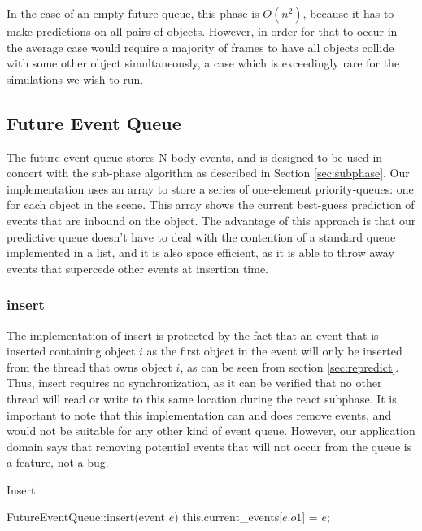 \documentclass[conference]{IEEEtran}
\begin{document}
In the case of an empty future queue, this phase is $O(n^2)$, because it has to make predictions on all pairs of objects.  However, in order for that to occur in the average case would require a majority of frames to have all objects collide
with some other object simultaneously, a case which is exceedingly rare for the simulations we wish to run.

\subsection{Future Event Queue}
\label{feq}
The future event queue stores N-body events, and is designed to be used in concert with the sub-phase algorithm as described in Section \ref{sec:subphase}.
Our implementation uses an array to store a series of one-element priority-queues: one for each object in the scene.  This array shows the current best-guess
prediction of events that are inbound on the object.  The advantage of this approach is that our predictive queue doesn't have to deal with the contention of 
a standard queue implemented in a list, and it is also space efficient, as it is able to throw away events that supercede other events at insertion time.


\subsubsection{insert}

The implementation of insert is protected by the fact that an event that is inserted containing object $i$ as the first object in the event will only
be inserted from the thread that owns object $i$, as can be seen from section \ref{sec:repredict}.  Thus, insert requires no synchronization, as it can be verified
that no other thread will read or write to this same location during the react subphase.  It is important to note that this implementation can and does remove events,
and would not be suitable for any other kind of event queue.  However, our application domain says that removing potential events that will not occur from the queue is a feature, not a bug.

\begin{algorithm}
\caption{Insert}
\begin{algorithmic}
\STATE FutureEventQueue::insert(event $e$)
	\STATE this.current\_events[$e.o1$] = $e$;
\ENDIF
\end{algorithmic}
\end{algorithm}
\end{document}
